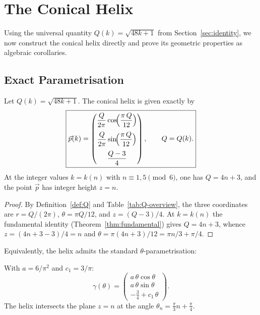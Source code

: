 \section{The Conical Helix}\label{sec:helix}

Using the universal quantity $Q(k) = \sqrt{48k+1}$ from
Section~\ref{sec:identity}, we now construct the conical helix
directly and prove its geometric properties as algebraic corollaries.

\subsection{Exact Parametrisation}

\begin{theorem}\label{thm:helix}
Let $Q(k) = \sqrt{48k+1}$. The conical helix is given exactly by
\begin{equation}\label{eq:helix-exact}
  \boxed{
  \vec{p}(k) =
  \begin{pmatrix}
    \dfrac{Q}{2\pi}\cos\!\Bigl(\dfrac{\pi\,Q}{12}\Bigr)\\[10pt]
    \dfrac{Q}{2\pi}\sin\!\Bigl(\dfrac{\pi\,Q}{12}\Bigr)\\[10pt]
    \dfrac{Q-3}{4}
  \end{pmatrix},
  \qquad Q = Q(k).
  }
\end{equation}
At the integer values $k = k(n)$ with $n \equiv 1, 5 \pmod{6}$,
one has $Q = 4n+3$, and the point $\vec{p}$ has integer height $z = n$.
\end{theorem}

\begin{proof}
By Definition~\ref{def:Q} and Table~\ref{tab:Q-overview}, the three
coordinates are $r = Q/(2\pi)$, $\theta = \pi Q/12$, and $z = (Q-3)/4$.
At $k = k(n)$ the fundamental identity (Theorem~\ref{thm:fundamental})
gives $Q = 4n+3$, whence $z = (4n+3-3)/4 = n$ and
$\theta = \pi(4n+3)/12 = \pi n/3 + \pi/4$.
\end{proof}

Equivalently, the helix admits the standard $\theta$-parametrisation:

\begin{corollary}\label{cor:theta-param}
With $a = 6/\pi^2$ and $c_1 = 3/\pi$:
\begin{equation}\label{eq:helix-theta}
  \gamma(\theta) =
  \begin{pmatrix}
    a\,\theta\cos\theta \\[4pt]
    a\,\theta\sin\theta \\[4pt]
    -\tfrac{3}{4} + c_1\,\theta
  \end{pmatrix}.
\end{equation}
The helix intersects the plane $z = n$ at the angle
$\theta_n = \frac{\pi}{3}n + \frac{\pi}{4}$.
\end{corollary}

